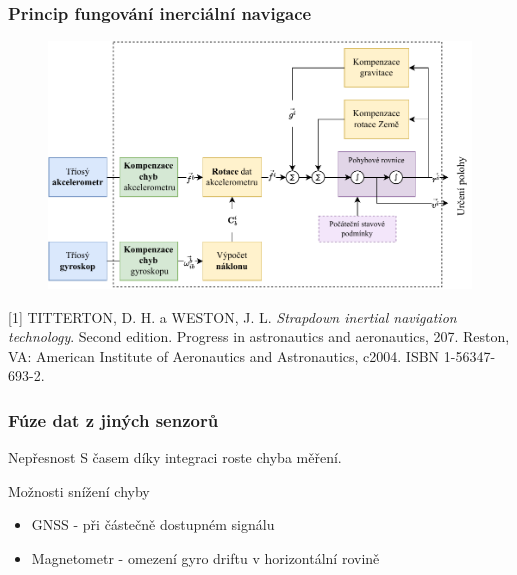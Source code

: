 \documentclass[%
  12pt,       				%
	t,                  %
	aspectratio=1610,   %
	unicode,						%
]{beamer}				    	%
\begin{document}
\begin{frame} 
	\frametitle{Princip fungování inerciální navigace}
	
			\begin{figure}%
				\centering
				
				\includegraphics[width=0.85\columnwidth]{obrazky/StrapdownBlock}
			\end{figure}
			\tiny [1] TITTERTON, D. H. a WESTON, J. L. \textit{Strapdown inertial navigation technology}. Second edition. Progress in astronautics and aeronautics, 207. Reston, VA: American Institute of Aeronautics and Astronautics, c2004. ISBN 1-56347-693-2.
	
\end{frame} 


\begin{frame} 
	\frametitle{Fúze dat z jiných senzorů}
		\begin{alertblock}{Nepřesnost}
		S časem díky integraci roste chyba měření.
		\end{alertblock}
		\vspace{4ex}
		\begin{block}{Možnosti snížení chyby}
		\begin{itemize}
		\item GNSS - při částečně dostupném signálu
		\item Magnetometr - omezení gyro driftu v horizontální rovině
		\end{itemize}
		\end{block}

	
\end{frame} 
\end{document}
